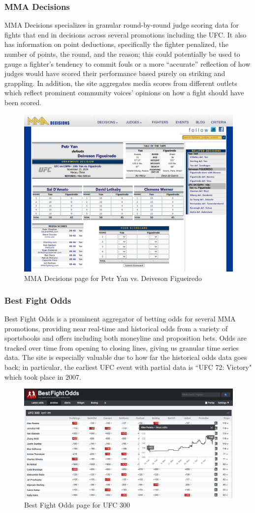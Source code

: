 \documentclass[12pt,twoside]{report}
\begin{document}
\subsubsection{MMA Decisions}

MMA Decisions specializes in granular round-by-round judge scoring data for fights that end in decisions across several promotions including the UFC. It also has information on point deductions, specifically the fighter penalized, the number of points, the round, and the reason; this could potentially be used to gauge a fighter's tendency to commit fouls or a more ``accurate'' reflection of how judges would have scored their performance based purely on striking and grappling. In addition, the site aggregates media scores from different outlets which reflect prominent community voices' opinions on how a fight should have been scored.

\begin{figure}[htb]
    \centering
    \includegraphics[width=0.5\linewidth]{figures/mmadecisions1.png}
    \caption{MMA Decisions page for Petr Yan vs. Deiveson Figueiredo}
\end{figure}


\subsubsection{Best Fight Odds}

Best Fight Odds is a prominent aggregator of betting odds for several MMA promotions, providing near real-time and historical odds from a variety of sportsbooks and offers including both moneyline and proposition bets. Odds are tracked over time from opening to closing lines, giving us granular time series data. The site is especially valuable due to how far the historical odds data goes back; in particular, the earliest UFC event with partial data is ``UFC 72: Victory" which took place in 2007.

\begin{figure}[htb]
    \centering
    \includegraphics[width=0.5\linewidth]{figures/bestfightodds1.png}
    \caption{Best Fight Odds page for UFC 300}
\end{figure}
\end{document}
